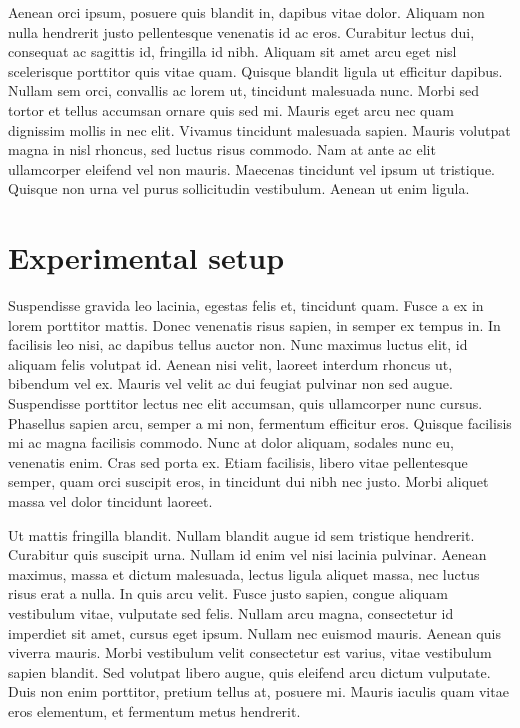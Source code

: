 \documentclass[final,5p,times,twocolumn]{elsarticle}
\begin{document}
Aenean orci ipsum, posuere quis blandit in, dapibus vitae dolor. Aliquam non nulla hendrerit justo pellentesque venenatis id ac eros. Curabitur lectus dui, consequat ac sagittis id, fringilla id nibh. Aliquam sit amet arcu eget nisl scelerisque porttitor quis vitae quam. Quisque blandit ligula ut efficitur dapibus. Nullam sem orci, convallis ac lorem ut, tincidunt malesuada nunc. Morbi sed tortor et tellus accumsan ornare quis sed mi. Mauris eget arcu nec quam dignissim mollis in nec elit. Vivamus tincidunt malesuada sapien. Mauris volutpat magna in nisl rhoncus, sed luctus risus commodo. Nam at ante ac elit ullamcorper eleifend vel non mauris. Maecenas tincidunt vel ipsum ut tristique. Quisque non urna vel purus sollicitudin vestibulum. Aenean ut enim ligula.

\section{Experimental setup}
\label{sec:ex}

Suspendisse gravida leo lacinia, egestas felis et, tincidunt quam. Fusce a ex in lorem porttitor mattis. Donec venenatis risus sapien, in semper ex tempus in. In facilisis leo nisi, ac dapibus tellus auctor non. Nunc maximus luctus elit, id aliquam felis volutpat id. Aenean nisi velit, laoreet interdum rhoncus ut, bibendum vel ex. Mauris vel velit ac dui feugiat pulvinar non sed augue. Suspendisse porttitor lectus nec elit accumsan, quis ullamcorper nunc cursus. Phasellus sapien arcu, semper a mi non, fermentum efficitur eros. Quisque facilisis mi ac magna facilisis commodo. Nunc at dolor aliquam, sodales nunc eu, venenatis enim. Cras sed porta ex. Etiam facilisis, libero vitae pellentesque semper, quam orci suscipit eros, in tincidunt dui nibh nec justo. Morbi aliquet massa vel dolor tincidunt laoreet.

Ut mattis fringilla blandit. Nullam blandit augue id sem tristique hendrerit. Curabitur quis suscipit urna. Nullam id enim vel nisi lacinia pulvinar. Aenean maximus, massa et dictum malesuada, lectus ligula aliquet massa, nec luctus risus erat a nulla. In quis arcu velit. Fusce justo sapien, congue aliquam vestibulum vitae, vulputate sed felis. Nullam arcu magna, consectetur id imperdiet sit amet, cursus eget ipsum. Nullam nec euismod mauris. Aenean quis viverra mauris. Morbi vestibulum velit consectetur est varius, vitae vestibulum sapien blandit. Sed volutpat libero augue, quis eleifend arcu dictum vulputate. Duis non enim porttitor, pretium tellus at, posuere mi. Mauris iaculis quam vitae eros elementum, et fermentum metus hendrerit.
\end{document}
